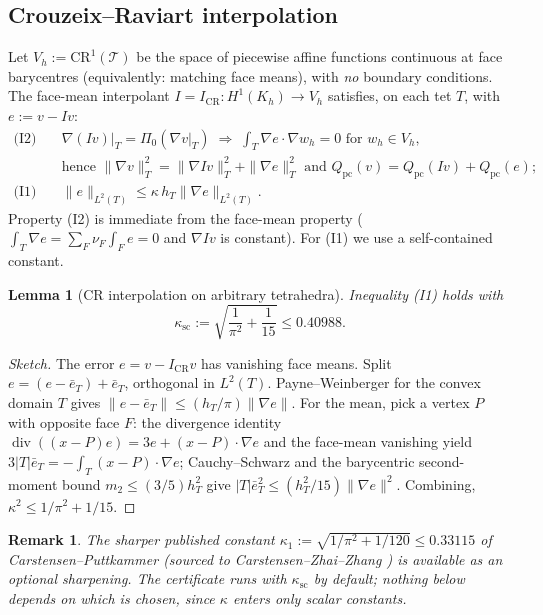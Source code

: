 \documentclass[11pt]{amsart}
\newtheorem{lemma}[theorem]{Lemma}
\newtheorem{remark}[theorem]{Remark}
\begin{document}
\subsection{Crouzeix--Raviart interpolation}

Let $V_h:=\mathrm{CR}^1(\mathcal{T})$ be the space of piecewise affine
functions continuous at face barycentres (equivalently: matching face
means), with \emph{no} boundary conditions.  The face-mean interpolant
$I=I_{\mathrm{CR}}:H^1(K_h)\to V_h$ satisfies, on each tet $T$, with
$e:=v-Iv$:
\begin{align*}
  \text{(I2)}\quad
  &\nabla(Iv)|_T=\Pi_0(\nabla v|_T)
  \;\Rightarrow\;
  \int_T\nabla e\cdot\nabla w_h=0\text{ for }w_h\in V_h,\\
  &\text{hence }
  \|\nabla v\|_T^2=\|\nabla Iv\|_T^2+\|\nabla e\|_T^2
  \text{ and }
  Q_{\mathrm{pc}}(v)=Q_{\mathrm{pc}}(Iv)+Q_{\mathrm{pc}}(e);\\
  \text{(I1)}\quad
  &\|e\|_{L^2(T)}\le\kappa\, h_T\|\nabla e\|_{L^2(T)}.
\end{align*}
Property (I2) is immediate from the face-mean property
($\int_T\nabla e=\sum_F\nu_F\int_F e=0$ and $\nabla Iv$ is constant).  For
(I1) we use a self-contained constant.

\begin{lemma}[CR interpolation on arbitrary tetrahedra]\label{lem:I1}
Inequality (I1) holds with
\[
  \kappa_{\mathrm{sc}}:=\sqrt{\frac1{\pi^2}+\frac1{15}}\le 0.40988.
\]
\end{lemma}

\begin{proof}[Sketch]
The error $e=v-I_{\mathrm{CR}}v$ has vanishing face means.  Split
$e=(e-\bar e_T)+\bar e_T$, orthogonal in $L^2(T)$.  Payne--Weinberger for
the convex domain $T$ \cite{PW60,Bebendorf03} gives
$\|e-\bar e_T\|\le(h_T/\pi)\|\nabla e\|$.  For the mean, pick a vertex $P$
with opposite face $F$: the divergence identity
$\operatorname{div}((x-P)e)=3e+(x-P)\cdot\nabla e$ and the face-mean
vanishing yield $3|T|\bar e_T=-\int_T(x-P)\cdot\nabla e$; Cauchy--Schwarz
and the barycentric second-moment bound $m_2\le(3/5)h_T^2$ give
$|T|\bar e_T^2\le(h_T^2/15)\|\nabla e\|^2$.  Combining,
$\kappa^2\le 1/\pi^2+1/15$.
\end{proof}

\begin{remark}
The sharper published constant
$\kappa_1:=\sqrt{1/\pi^2+1/120}\le 0.33115$ of Carstensen--Puttkammer
\cite[§2.4]{CP22} (sourced to Carstensen--Zhai--Zhang \cite{CZZ20}) is
available as an optional sharpening.  The certificate runs with
$\kappa_{\mathrm{sc}}$ by default; nothing below depends on which is
chosen, since $\kappa$ enters only scalar constants.
\end{remark}
\end{document}
